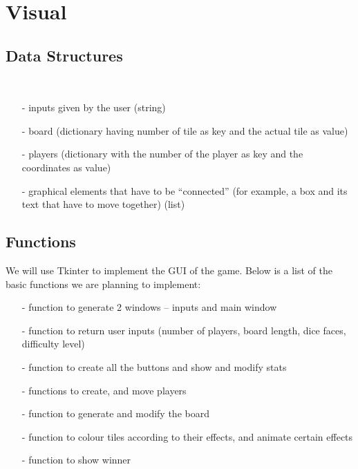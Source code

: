 \documentclass[11pt]{article}
\begin{document}
\section*{Visual}
\subsection*{Data Structures}\
\begin{itemize}
	\item [-] inputs given by the user (string)
	\item [-] board (dictionary having number of tile as key and the actual tile as value)
	\item [-] players (dictionary with the number of the player as key and the coordinates as value)
	\item [-] graphical elements that have to be ``connected'' (for example, a box and its text that have to move together) (list)
\end{itemize}


\subsection*{Functions}
We will use Tkinter to implement the GUI of the game.
Below is a list of the basic functions we are planning to implement:
\begin{itemize}
	\item [-] function to generate 2 windows -- inputs and main window
	\item [-] function to return user inputs (number of players, board length, dice faces, difficulty level)
	\item [-] function to create all the buttons and show and modify stats
	\item [-] functions to create, and move players
	\item [-] function to generate and modify the board
	\item [-] function to colour tiles according to their effects, and animate certain effects
	\item [-] function to show winner
\end{itemize}
\end{document}
